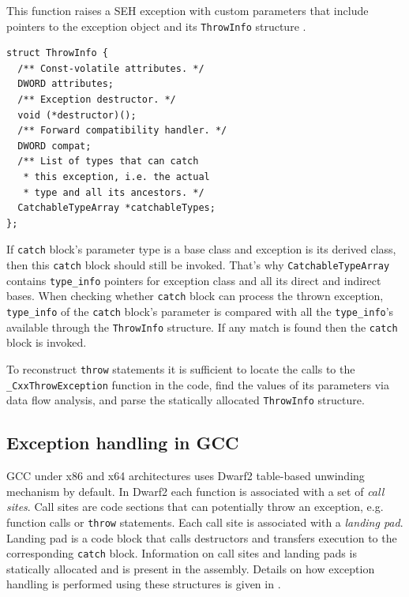 \documentclass[times, 10pt,twocolumn]{article}
\renewcommand{\~}{{\raise.35ex\hbox{$\scriptstyle\sim$}}}
\begin{document}
This function raises a SEH exception with custom parameters that include
pointers to the exception object and its \lstinline{ThrowInfo} structure
\cite{skochinsky06e}.
{
\lstset{basicstyle=\small}
\begin{lstlisting}
struct ThrowInfo {
  /** Const-volatile attributes. */
  DWORD attributes;
  /** Exception destructor. */
  void (*destructor)();
  /** Forward compatibility handler. */
  DWORD compat;
  /** List of types that can catch
   * this exception, i.e. the actual
   * type and all its ancestors. */
  CatchableTypeArray *catchableTypes;
};
\end{lstlisting}
}

If \lstinline{catch} block's parameter type is a base class and exception is its derived class, then this
\lstinline{catch} block should still be invoked. That's why \lstinline{CatchableTypeArray} contains
\lstinline{type_info} pointers for exception class and all its direct and indirect bases.
When checking whether \lstinline{catch} block can process the thrown exception, \lstinline{type_info}
of the \lstinline{catch} block's parameter is compared with all the \lstinline{type_info}'s available
through the \lstinline{ThrowInfo} structure. If any match is found then the \lstinline{catch} block is invoked.

To reconstruct \lstinline{throw} statements it is sufficient to locate the calls to
the \lstinline{_CxxThrowException} function in the code, find the values of its
parameters via data flow analysis, and parse the statically
allocated \lstinline{ThrowInfo} structure.




\quad
\subsection{Exception handling in GCC}
GCC under x86 and x64 architectures uses Dwarf2 table-based unwinding mechanism by default.
In Dwarf2 each function is associated with a set of \textit{call sites}. Call sites
are code sections that can potentially throw an exception, e.g. function calls or
\lstinline{throw} statements. Each call site is associated with a \textit{landing pad}.
Landing pad is a code block that calls destructors and transfers execution to the
corresponding \lstinline{catch} block. Information on call sites and landing pads is
statically allocated and is present in the assembly. Details on how exception
handling is performed using these structures is given in \cite{gccabi}.
\end{document}
